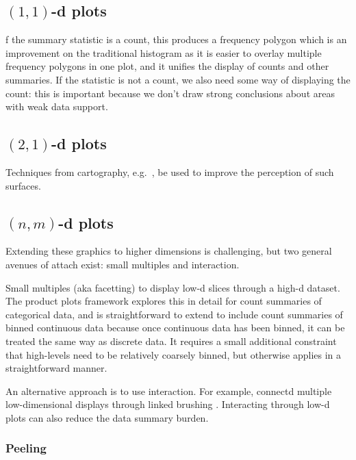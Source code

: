\documentclass[journal]{vgtc}                %
\begin{document}
\subsection{$(1,1)$-d plots}
\label{sub:1d-plots}

f the summary statistic is a count, this produces a frequency polygon \citep{scott:1985a} which is an improvement on the traditional histogram as it is easier to overlay multiple frequency polygons in one plot, and it unifies the display of counts and other summaries. If the statistic is not a count, we also need some way of displaying the count: this is important because we don't draw strong conclusions about areas with weak data support.

\subsection{$(2,1)$-d plots}
\label{sub:2d-plots}

Techniques from cartography, e.g.\ \citep{kennelly:2002}, be used to improve the perception of such surfaces.

\subsection{$(n, m)$-d plots}
\label{sub:nd-plots}

Extending these graphics to higher dimensions is challenging, but two general avenues of attach exist: small multiples and interaction.

Small multiples (aka facetting) to display low-d slices through a high-d dataset. The product plots \citep{me:prodplots} framework explores this in detail for count summaries of categorical data, and is straightforward to extend to include count summaries of binned continuous data because once continuous data has been binned, it can be treated the same way as discrete data. It requires a small additional constraint that high-levels need to be relatively coarsely binned, but otherwise applies in a straightforward manner.

An alternative approach is to use interaction. For example, connectd multiple low-dimensional displays through linked brushing \citep{liu:2013,swayne:2003}.  Interacting through low-d plots can also reduce the data summary burden.

\subsubsection{Peeling}
\label{sub:peeling}
\end{document}
